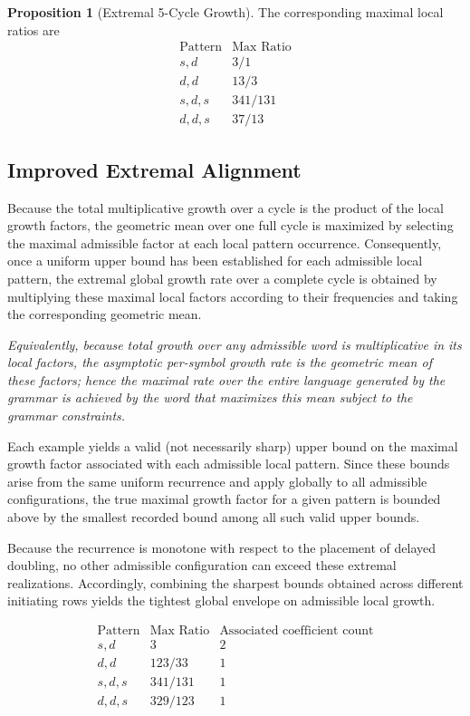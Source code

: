 \documentclass[12pt, oneside]{article}
\numberwithin{equation}{section}
\theoremstyle{definition}
\newtheorem{proposition}{Proposition}[section]
\theoremstyle{plain}
\theoremstyle{remark}
\begin{document}
\begin{proposition}[Extremal 5-Cycle Growth]
The corresponding maximal local ratios are
\[
\begin{array}{c|c}
\text{Pattern} & \text{Max Ratio} \\
\hline
s,d & 3/1 \\
d,d & 13/3 \\
s,d,s & 341/131 \\
d,d,s & 37/13
\end{array}
\]

\subsection*{Improved Extremal Alignment}

Because the total multiplicative growth over a cycle is the product of the local
growth factors, the geometric mean over one full cycle is maximized by selecting
the maximal admissible factor at each local pattern occurrence. Consequently,
once a uniform upper bound has been established for each admissible local pattern,
the extremal global growth rate over a complete cycle is obtained by multiplying
these maximal local factors according to their frequencies and taking the
corresponding geometric mean.

\emph{Equivalently, because total growth over any admissible word is multiplicative in
its local factors, the asymptotic per-symbol growth rate is the geometric mean of these
factors;  hence the maximal rate over the entire language generated by the grammar is
achieved by the word that maximizes this mean subject to the grammar constraints.}

Each example yields a valid (not necessarily sharp) upper bound on the maximal growth
factor associated with each admissible local pattern.  Since these bounds arise from
the same uniform recurrence and apply globally to all admissible configurations, the
true maximal growth factor for a given pattern is bounded above by the smallest
recorded bound among all such valid upper bounds.

Because the recurrence is monotone with respect to the placement of delayed doubling,
no other admissible configuration can exceed these extremal realizations.
Accordingly, combining the sharpest bounds obtained across different initiating
rows yields the tightest global envelope on admissible local growth.

\[
\begin{array}{c|c|c}
\text{Pattern} & \text{Max Ratio} & \text{Associated coefficient count} \\
\hline
s,d & 3 & 2 \\
d,d & 123/33 & 1 \\
s,d,s & 341/131 & 1 \\
d,d,s & 329/123 & 1
\end{array}
\]


\end{proposition}
\end{document}
